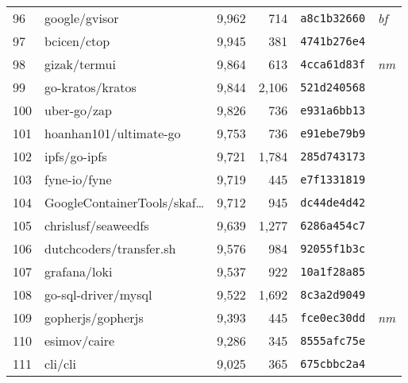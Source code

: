 {\begin{supertabular}{llrrll}
        96  &                      google/gvisor &  9,962 &    714 &  \texttt{a8c1b32660} &  \textit{bf} \\
        97  &                        bcicen/ctop &  9,945 &    381 &  \texttt{4741b276e4} &              \\
        98  &                       gizak/termui &  9,864 &    613 &  \texttt{4cca61d83f} &  \textit{nm} \\
        99  &                   go-kratos/kratos &  9,844 &  2,106 &  \texttt{521d240568} &              \\
        100 &                        uber-go/zap &  9,826 &    736 &  \texttt{e931a6bb13} &              \\
        101 &             hoanhan101/ultimate-go &  9,753 &    736 &  \texttt{e91ebe79b9} &              \\
        102 &                       ipfs/go-ipfs &  9,721 &  1,784 &  \texttt{285d743173} &              \\
        103 &                       fyne-io/fyne &  9,719 &    445 &  \texttt{e7f1331819} &              \\
        104 &    GoogleContainerTools/skaf\ldots &  9,712 &    945 &  \texttt{dc44de4d42} &              \\
        105 &                chrislusf/seaweedfs &  9,639 &  1,277 &  \texttt{6286a454c7} &              \\
        106 &            dutchcoders/transfer.sh &  9,576 &    984 &  \texttt{92055f1b3c} &              \\
        107 &                       grafana/loki &  9,537 &    922 &  \texttt{10a1f28a85} &              \\
        108 &                go-sql-driver/mysql &  9,522 &  1,692 &  \texttt{8c3a2d9049} &              \\
        109 &                  gopherjs/gopherjs &  9,393 &    445 &  \texttt{fce0ec30dd} &  \textit{nm} \\
        110 &                       esimov/caire &  9,286 &    345 &  \texttt{8555afc75e} &              \\
        111 &                            cli/cli &  9,025 &    365 &  \texttt{675cbbc2a4} &              \\

\end{supertabular}}
